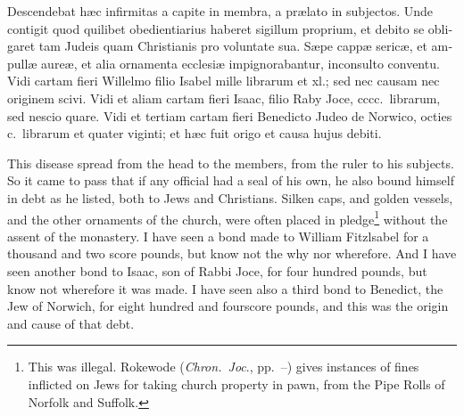 \documentclass{book}
\begin{document}
\begin{paracol}{2}
\switchcolumn*

\begin{otherlanguage}{latin}
Descendebat h\ae{}c infirmitas a capite in membra, a pr\ae{}lato in subjectos. Unde contigit quod quilibet obedientiarius haberet sigillum proprium, et debito se obligaret tam Judeis quam Christianis pro voluntate sua. S\ae{}pe capp\ae{} seric\ae{}, et ampull\ae{} aure\ae{}, et alia ornamenta ecclesi\ae{} impignorabantur, inconsulto conventu. Vidi cartam fieri Willelmo filio Isabel mille librarum et xl.; sed nec causam nec originem scivi. Vidi et aliam cartam fieri Isaac, filio Raby Joce, cccc.\ librarum, sed nescio quare. Vidi et tertiam cartam fieri Benedicto Judeo de Norwico, octies c.\ librarum et quater viginti; et h\ae{}c fuit origo et causa hujus debiti.
\end{otherlanguage}

\switchcolumn

This disease spread from the head to the members, from the ruler to his subjects. So it came to pass that if any official had a seal of his own, he also bound himself in debt as he listed, both to Jews and Christians. Silken caps, and golden vessels, and the other ornaments of the church, were often placed in pledge\footnote{This was illegal. Rokewode (\emph{Chron.\ Joc}., pp.\ --) gives instances of fines inflicted on Jews for taking church property in pawn, from the Pipe Rolls of Norfolk and Suffolk.} without the assent of the monastery. I have seen a bond made to William Fitzlsabel for a thousand and two score pounds, but know not the why nor wherefore. And I have seen another bond to Isaac, son of Rabbi Joce, for four hundred pounds, but know not wherefore it was made. I have seen also a third bond to Benedict, the Jew of Norwich, for eight hundred and fourscore pounds, and this was the origin and cause of that debt.

\switchcolumn*


\end{paracol}
\end{document}
